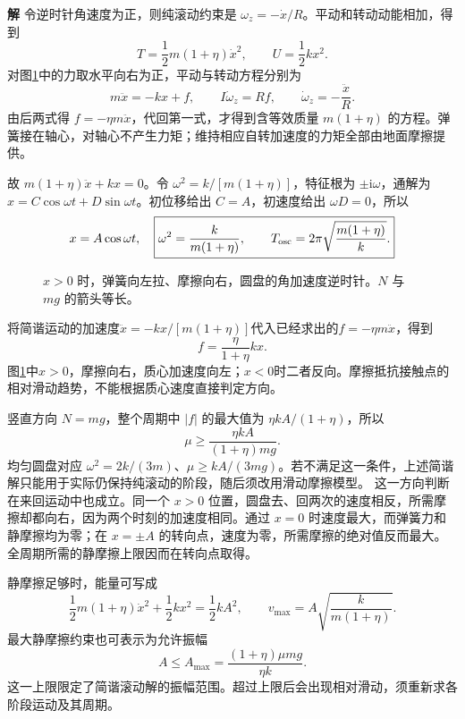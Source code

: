 \documentclass[11pt,openany,fontset=fandol]{ctexbook}
\theoremstyle{definition}\newtheorem{example}{例}[chapter]\newtheorem{exercise}{习题}[chapter]
\newcommand{\SolutionStart}{\par\medskip\ifdim\pagetotal>0pt\ifdim\dimexpr\pagegoal-\pagetotal\relax<3\baselineskip\newpage\fi\fi\noindent\textbf{解}\quad\ignorespaces}
\newenvironment{solution}{\SolutionStart}{\par\medskip}
\begin{document}
\begin{solution}
令逆时针角速度为正，则纯滚动约束是 $\omega_z=-\dot x/R$。平动和转动动能相加，得到
\[
T=\frac12m(1+\eta)\dot x^2,\qquad U=\frac12kx^2.
\]
对图\ref{mp5:fig:l5-e8-s}中的力取水平向右为正，平动与转动方程分别为
\[
m\ddot x=-kx+f,\qquad I\dot\omega_z=Rf,
\qquad \dot\omega_z=-\frac{\ddot x}{R}.
\]
由后两式得 $f=-\eta m\ddot x$，代回第一式，才得到含等效质量 $m(1+\eta)$ 的方程。弹簧接在轴心，对轴心不产生力矩；维持相应自转加速度的力矩全部由地面摩擦提供。

故 $m(1+\eta)\ddot x+kx=0$。令 $\omega^2=k/[m(1+\eta)]$，特征根为 $\pm\mathrm i\omega$，通解为 $x=C\cos\omega t+D\sin\omega t$。初位移给出 $C=A$，初速度给出 $\omega D=0$，所以
\[
x=A\cos\omega t,\quad
\boxed{\omega^2=\frac{k}{m(1+\eta)},\qquad
T_{\rm osc}=2\pi\sqrt{\frac{m(1+\eta)}k}.}
\]

\begin{figure}[H]\centering
{}
\caption{$x>0$ 时，弹簧向左拉、摩擦向右，圆盘的角加速度逆时针。$N$ 与 $mg$ 的箭头等长。}\label{mp5:fig:l5-e8-s}
\end{figure}

将简谐运动的加速度$\ddot x=-kx/[m(1+\eta)]$代入已经求出的$f=-\eta m\ddot x$，得到
\[
f=\frac{\eta}{1+\eta}kx.
\]
图\ref{mp5:fig:l5-e8-s}中$x>0$，摩擦向右，质心加速度向左；$x<0$时二者反向。摩擦抵抗接触点的相对滑动趋势，不能根据质心速度直接判定方向。

竖直方向 $N=mg$，整个周期中 $|f|$ 的最大值为 $\eta kA/(1+\eta)$，所以
\[
\boxed{\mu\ge\frac{\eta kA}{(1+\eta)mg}.}
\]
均匀圆盘对应 $\omega^2=2k/(3m)$、$\mu\ge kA/(3mg)$。若不满足这一条件，上述简谐解只能用于实际仍保持纯滚动的阶段，随后须改用滑动摩擦模型。
这一方向判断在来回运动中也成立。同一个 $x>0$ 位置，圆盘去、回两次的速度相反，所需摩擦却都向右，因为两个时刻的加速度相同。通过 $x=0$ 时速度最大，而弹簧力和静摩擦均为零；在 $x=\pm A$ 的转向点，速度为零，所需摩擦的绝对值反而最大。全周期所需的静摩擦上限因而在转向点取得。

静摩擦足够时，能量可写成
\[
\frac12m(1+\eta)\dot x^2+\frac12kx^2=\frac12kA^2,
\qquad v_{\max}=A\sqrt{\frac{k}{m(1+\eta)}}.
\]
最大静摩擦约束也可表示为允许振幅
\[
A\le A_{\max}=\frac{(1+\eta)\mu mg}{\eta k}.
\]
这一上限限定了简谐滚动解的振幅范围。超过上限后会出现相对滑动，须重新求各阶段运动及其周期。

\end{solution}
\end{document}
